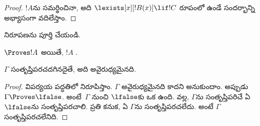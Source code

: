 \documentclass[../../../include/open-logic-section]{subfiles}
\begin{document}
\begin{proof}
{$!A$ను \QR{} సమర్థించినా, అది $\lexists[x][!B(x)] \lif !C$ రూపంలో
ఉండే సందర్భాన్ని అభ్యాసంగా వదిలేస్తాం.}{}
\end{proof}

\begin{prob}
   నిరూపణను పూర్తి చేయండి.
\end{prob}
\tagendprob

\begin{cor}
$\Proves !A$ అయితే, $!A$ .
\end{cor}

\begin{cor}
$\Gamma$ సంతృప్తిపరచదగినదైతే, అది అవైరుధ్యమైనది.
\end{cor}

\begin{proof}
విపర్యయ పద్ధతిలో నిరూపిస్తాం. $\Gamma$ అవైరుధ్యమైనది కాదని అనుకుందాం.
అప్పుడు $\Gamma \Proves \lfalse$. అంటే~$\Gamma$ నుంచి $\lfalse$కు
ఒక  ఉంది.  వల్ల, $\Gamma$ను
సంతృప్తిపరిచే ఏ
~$\lfalse$ను సంతృప్తిపరచాలి. ప్రతి
 కనుక, ఏ
 $\Gamma$ను
సంతృప్తిపరచలేదు. అంటే $\Gamma$ సంతృప్తిపరచలేనిది.
\end{proof}
\end{document}
